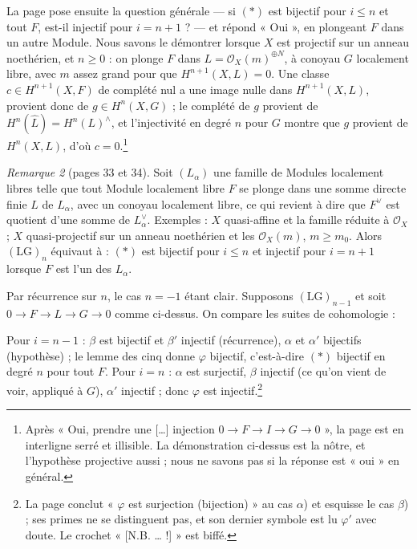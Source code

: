 \documentclass[11pt,a4paper]{article}
\begin{document}
La page pose ensuite la question générale --- si $(*)$ est bijectif pour
$i \leq n$ et tout $F$, est-il injectif pour $i = n+1$ ? --- et répond « Oui
», en plongeant $F$ dans un autre Module. Nous savons le démontrer lorsque $X$
est projectif sur un anneau noethérien, et $n \geq 0$ : on plonge $F$ dans
$L = \mathcal{O}_X(m)^{\oplus N}$, à conoyau $G$ localement libre, avec
$m$ assez grand pour que $H^{n+1}(X, L) = 0$. Une classe $c \in H^{n+1}(X, F)$
de complété nul a une image nulle dans $H^{n+1}(X, L)$, provient donc de
$g \in H^n(X, G)$ ; le complété de $g$ provient de $H^n(\widehat{L}) =
H^n(L)^{\wedge}$, et l'injectivité en degré $n$ pour $G$ montre que $g$ provient
de $H^n(X, L)$, d'où $c = 0$.\footnote{Après « Oui, prendre une […] injection
$0 \to F \to I \to G \to 0$ », la page est en interligne serré et illisible.
La démonstration ci-dessus est la nôtre, et l'hypothèse projective aussi ;
nous ne savons pas si la réponse est « oui » en général.}

\emph{Remarque 2} (pages 33 et 34). Soit $(L_\alpha)$ une famille de Modules
localement libres telle que tout Module localement libre $F$ se plonge dans
une somme directe finie $L$ de $L_\alpha$, avec un conoyau localement libre,
ce qui revient à dire que $F^\vee$ est quotient d'une somme de
$L_\alpha^\vee$. Exemples : $X$ quasi-affine et la famille réduite à
$\mathcal{O}_X$ ; $X$ quasi-projectif sur un anneau noethérien et les
$\mathcal{O}_X(m)$, $m \geq m_0$. Alors $(\mathrm{LG})_n$ équivaut à : $(*)$
est bijectif pour $i \leq n$ et injectif pour $i = n+1$ lorsque $F$ est l'un
des $L_\alpha$.

Par récurrence sur $n$, le cas $n = -1$ étant clair. Supposons
$(\mathrm{LG})_{n-1}$ et soit $0 \to F \to L \to G \to 0$ comme ci-dessus. On
compare les suites de cohomologie :


Pour $i = n-1$ : $\beta$ est bijectif et $\beta'$ injectif (récurrence),
$\alpha$ et $\alpha'$ bijectifs (hypothèse) ; le lemme des cinq donne $\varphi$
bijectif, c'est-à-dire $(*)$ bijectif en degré $n$ pour tout $F$. Pour $i = n$ :
$\alpha$ est surjectif, $\beta$ injectif (ce qu'on vient de voir, appliqué à
$G$), $\alpha'$ injectif ; donc $\varphi$ est injectif.\footnote{La page
conclut « $\varphi$ est surjection (bijection) » au cas $\alpha$) et esquisse
le cas $\beta$) ; ses primes ne se distinguent pas, et son dernier symbole est
lu $\varphi'$ avec doute. Le crochet « [N.B. … !] » est biffé.}
\end{document}
